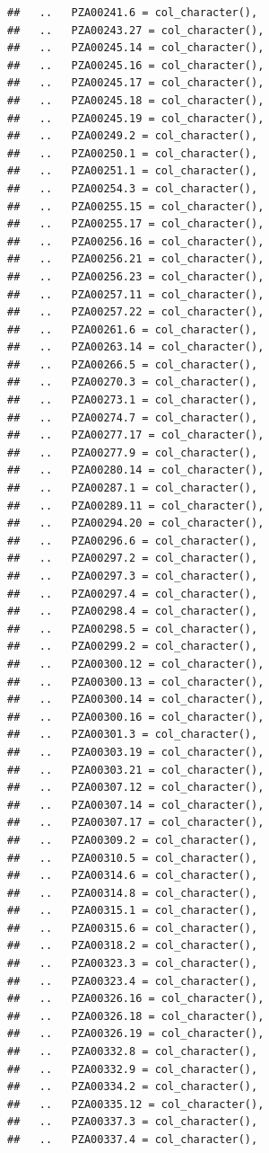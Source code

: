 \documentclass[
]{article}
\begin{document}
\begin{verbatim}
##   ..   PZA00241.6 = col_character(),
##   ..   PZA00243.27 = col_character(),
##   ..   PZA00245.14 = col_character(),
##   ..   PZA00245.16 = col_character(),
##   ..   PZA00245.17 = col_character(),
##   ..   PZA00245.18 = col_character(),
##   ..   PZA00245.19 = col_character(),
##   ..   PZA00249.2 = col_character(),
##   ..   PZA00250.1 = col_character(),
##   ..   PZA00251.1 = col_character(),
##   ..   PZA00254.3 = col_character(),
##   ..   PZA00255.15 = col_character(),
##   ..   PZA00255.17 = col_character(),
##   ..   PZA00256.16 = col_character(),
##   ..   PZA00256.21 = col_character(),
##   ..   PZA00256.23 = col_character(),
##   ..   PZA00257.11 = col_character(),
##   ..   PZA00257.22 = col_character(),
##   ..   PZA00261.6 = col_character(),
##   ..   PZA00263.14 = col_character(),
##   ..   PZA00266.5 = col_character(),
##   ..   PZA00270.3 = col_character(),
##   ..   PZA00273.1 = col_character(),
##   ..   PZA00274.7 = col_character(),
##   ..   PZA00277.17 = col_character(),
##   ..   PZA00277.9 = col_character(),
##   ..   PZA00280.14 = col_character(),
##   ..   PZA00287.1 = col_character(),
##   ..   PZA00289.11 = col_character(),
##   ..   PZA00294.20 = col_character(),
##   ..   PZA00296.6 = col_character(),
##   ..   PZA00297.2 = col_character(),
##   ..   PZA00297.3 = col_character(),
##   ..   PZA00297.4 = col_character(),
##   ..   PZA00298.4 = col_character(),
##   ..   PZA00298.5 = col_character(),
##   ..   PZA00299.2 = col_character(),
##   ..   PZA00300.12 = col_character(),
##   ..   PZA00300.13 = col_character(),
##   ..   PZA00300.14 = col_character(),
##   ..   PZA00300.16 = col_character(),
##   ..   PZA00301.3 = col_character(),
##   ..   PZA00303.19 = col_character(),
##   ..   PZA00303.21 = col_character(),
##   ..   PZA00307.12 = col_character(),
##   ..   PZA00307.14 = col_character(),
##   ..   PZA00307.17 = col_character(),
##   ..   PZA00309.2 = col_character(),
##   ..   PZA00310.5 = col_character(),
##   ..   PZA00314.6 = col_character(),
##   ..   PZA00314.8 = col_character(),
##   ..   PZA00315.1 = col_character(),
##   ..   PZA00315.6 = col_character(),
##   ..   PZA00318.2 = col_character(),
##   ..   PZA00323.3 = col_character(),
##   ..   PZA00323.4 = col_character(),
##   ..   PZA00326.16 = col_character(),
##   ..   PZA00326.18 = col_character(),
##   ..   PZA00326.19 = col_character(),
##   ..   PZA00332.8 = col_character(),
##   ..   PZA00332.9 = col_character(),
##   ..   PZA00334.2 = col_character(),
##   ..   PZA00335.12 = col_character(),
##   ..   PZA00337.3 = col_character(),
##   ..   PZA00337.4 = col_character(),

\end{verbatim}
\end{document}
